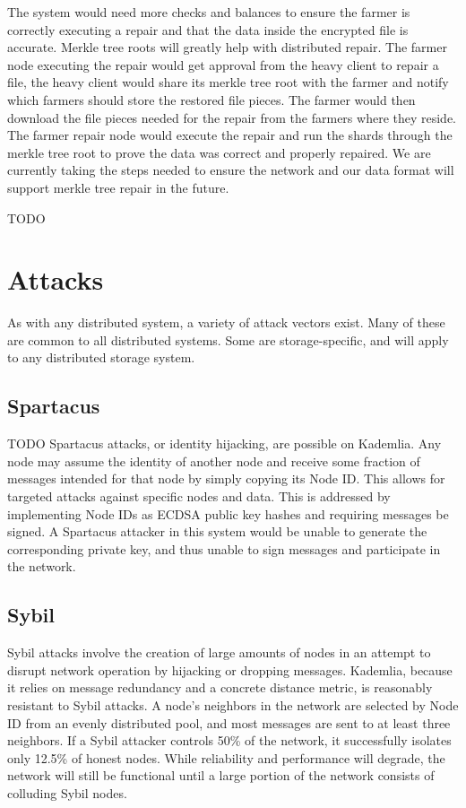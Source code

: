 \documentclass[a4paper,10pt]{article} \usepackage[utf8]{inputenc}
\newcommand{\todo}[1]{{\color{red} TODO #1 }}
\begin{document}
The system would need more checks and balances to ensure the farmer is correctly
executing a repair and that the data inside the encrypted file is accurate.
Merkle tree roots will greatly help with distributed repair. The farmer node
executing the repair would get approval from the heavy client to repair a file,
the heavy client would share its merkle tree root with the farmer and notify
which farmers should store the restored file pieces. The farmer would then
download the file pieces needed for the repair from the farmers where they
reside. The farmer repair node would execute the repair and run the shards
through the merkle tree root to prove the data was correct and properly
repaired. We are currently taking the steps needed to ensure the network and our
data format will support merkle tree repair in the future.

\todo{}

\newpage \appendix

\section{Attacks}

As with any distributed system, a variety of attack vectors exist. Many of these
are common to all distributed systems. Some are storage-specific, and will apply
to any distributed storage system.

\subsection{Spartacus}

\todo{ Spartacus attacks, or identity hijacking, are possible on Kademlia. Any
node may assume the identity of another node and receive some fraction of
messages intended for that node by simply copying its Node ID. This allows for
targeted attacks against specific nodes and data. This is addressed by
implementing Node IDs as ECDSA public key hashes and requiring messages be
signed. A Spartacus attacker in this system would be unable to generate the
corresponding private key, and thus unable to sign messages and participate in
the network. }

\subsection{Sybil}

Sybil attacks involve the creation of large amounts of nodes in an attempt to
disrupt network operation by hijacking or dropping messages. Kademlia, because
it relies on message redundancy and a concrete distance metric, is reasonably
resistant to Sybil attacks. A node's neighbors in the network are selected by
Node ID from an evenly distributed pool, and most messages are sent to at least
three neighbors. If a Sybil attacker controls 50\% of the network, it
successfully isolates only 12.5\% of honest nodes. While reliability and
performance will degrade, the network will still be functional until a large
portion of the network consists of colluding Sybil nodes.
\end{document}
